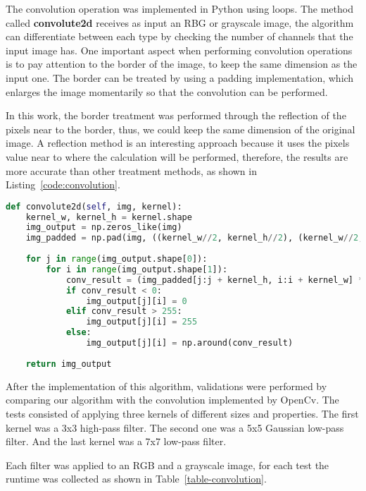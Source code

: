 \documentclass[]{IEEEtran}
\begin{document}
The convolution operation was implemented in Python using loops. The method called \textbf{convolute2d} receives as input an RBG or grayscale image, the algorithm can differentiate between each type by checking the number of channels that the input image has. One important aspect when performing convolution operations is to pay attention to the border of the image, to keep the same dimension as the input one. The border can be treated by using a padding implementation, which enlarges the image momentarily so that the convolution can be performed.

In this work, the border treatment was performed through the reflection of the pixels near to the border, thus, we could keep the same dimension of the original image. A reflection method is an interesting approach because it uses the pixels value near to where the calculation will be performed, therefore, the results are more accurate than other treatment methods, as shown in Listing~\ref{code:convolution}.

 \begin{lstlisting}[language=Python, caption={Convolution algorithm for Grayscale images with padding treated using reflection.}, label={code:convolution}]
def convolute2d(self, img, kernel):
    kernel_w, kernel_h = kernel.shape
    img_output = np.zeros_like(img)
    img_padded = np.pad(img, ((kernel_w//2, kernel_h//2), (kernel_w//2, kernel_h//2), (0, 0)), 'reflect')
    
    for j in range(img_output.shape[0]):
        for i in range(img_output.shape[1]):
            conv_result = (img_padded[j:j + kernel_h, i:i + kernel_w] * kernel).sum()
            if conv_result < 0:
                img_output[j][i] = 0
            elif conv_result > 255:
                img_output[j][i] = 255
            else:
                img_output[j][i] = np.around(conv_result)
                
    return img_output
\end{lstlisting}

After the implementation of this algorithm, validations were performed by comparing our algorithm with the convolution implemented by OpenCv. The tests consisted of applying three kernels of different sizes and properties. The first kernel was a 3x3 high-pass filter. The second one was a 5x5 Gaussian low-pass filter. And the last kernel was a 7x7 low-pass filter.

Each filter was applied to an RGB and a grayscale image, for each test the runtime was collected as shown in Table~\ref{table-convolution}.
\end{document}
